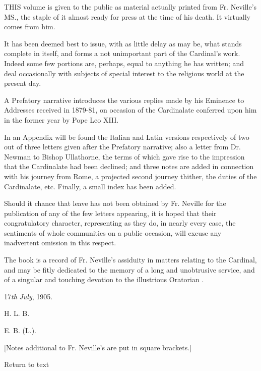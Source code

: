 



THIS volume is given to the public as
material actually printed from Fr. Neville's MS., the staple of it
almost ready for press at the time of his death. It virtually comes
from him.


It has been deemed best to issue, with as little delay as may be,
what stands complete in itself, and forms a not unimportant part of
the Cardinal's work. Indeed some few portions are, perhaps, equal to
anything he has written; and deal occasionally with subjects of
special interest to the religious world at the present day.


A Prefatory narrative introduces the various replies made by his
Eminence to Addresses received in 1879-81, on occasion of the
Cardinalate conferred upon him in the former year by Pope Leo XIII.


In an Appendix will be found the Italian and Latin versions
respectively of two out of three letters given after the Prefatory
narrative; also a letter from Dr. Newman to Bishop Ullathorne, the
terms of which gave rise to the impression that the Cardinalate had
been declined; and three notes are added in connection with his journey from Rome, a projected second journey thither, the duties of
the Cardinalate, etc. Finally, a small index has been added.


Should it chance that leave has not been obtained by Fr. Neville
for the publication of any of the few letters appearing, it is hoped
that their congratulatory character, representing as they do, in
nearly every case, the sentiments of whole communities on a public
occasion, will excuse any inadvertent omission in this respect.


The book is a record of Fr. Neville's assiduity in matters relating
to the Cardinal, and may be fitly dedicated to the memory of a long
and unobtrusive service, and of a singular and touching devotion to
the illustrious Oratorian .


17\emph{th} \emph{July}, 1905.


H. L. B.

E. B. (L.).






[Notes additional to Fr. Neville's are put in square brackets.]

Return to text


